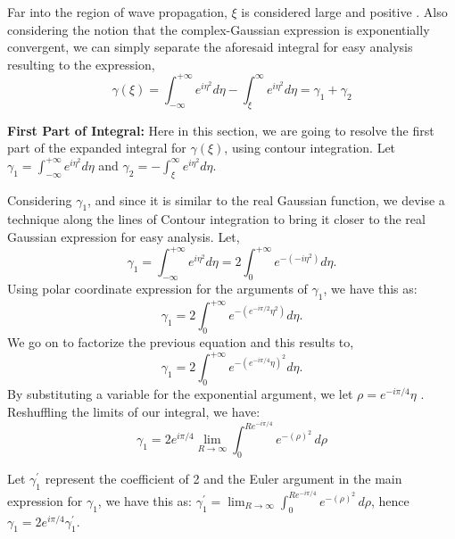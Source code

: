 \documentclass[conference]{IEEEtran}
\begin{document}
Far into the region of wave propagation, $\xi$ is considered large and positive  \cite{Nicholson1990AnAR} \cite{1984prin.conf..513S}. Also considering the notion that the complex-Gaussian expression is exponentially convergent, we can simply separate the aforesaid integral for easy analysis resulting to the expression,
\begin{equation}
    \gamma(\xi) = \int_{-\infty}^{+ \infty}e^{i\eta^{2}}d\eta - \int_{\xi}^{\infty}e^{i\eta^{2}}d\eta = \gamma_{1} + \gamma_{2}
\end{equation}

\textbf{First Part of Integral:}
Here in this section, we are going to resolve the first part of the expanded integral for $\gamma(\xi)$, using contour integration. Let $\gamma_{1} = \int_{-\infty}^{+ \infty}e^{i\eta^{2}}d\eta$ and $\gamma_{2} = - \int_{\xi}^{\infty}e^{i\eta^{2}}d\eta$.

Considering $\gamma_{1}$, and since it is similar to the real Gaussian function, we devise a technique along the lines of Contour integration to bring it closer to the real Gaussian expression for easy analysis. Let,
\begin{equation}
    \gamma_{1} = \int_{-\infty}^{+ \infty}e^{i\eta^{2}}d\eta = 2\int_{0}^{+ \infty}e^{-(-i\eta^{2})}d\eta.
\end{equation}
Using polar coordinate expression for the arguments of $\gamma_{1}$, we have this as:
\begin{equation}
    \gamma_{1} = 2\int_{0}^{+ \infty}e^{-(e^{-i\pi/2} \eta^{2})}d\eta.
\end{equation}
We go on to factorize the previous equation and this results to, 
\begin{equation}
    \gamma_{1} = 2\int_{0}^{+ \infty}e^{-(e^{-i\pi/4} \eta)^{2}}d\eta.
\end{equation}
By substituting a variable for the exponential argument, we let $\rho = e^{-i\pi/4} \eta$ \cite{video}. Reshuffling the limits of our integral, we have: 
\begin{equation}
    \gamma_{1} = 2 e^{i\pi/4} \lim_{{R \to \infty}} \int_{0}^{Re^{-i\pi/4}} e^{-(\rho)^{2}} \, d\rho
\end{equation}

Let $\gamma_{1}^{'}$ represent the coefficient of 2 and the Euler argument in the main expression for $\gamma_{1}$, we have this as: $\gamma_{1}^{'} = \lim_{{R \to \infty}} \int_{0}^{Re^{-i\pi/4}} e^{-(\rho)^{2}} \, d\rho$, hence $\gamma_{1} = 2 e^{i\pi/4} \gamma_{1}^{'}$.
\end{document}
